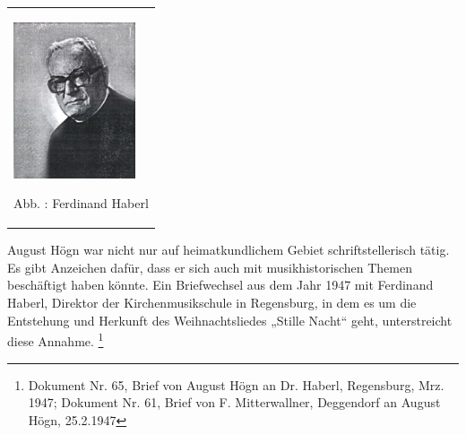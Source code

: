 \begin{flushleft}
\tablefirsthead{}
\tablehead{}
\tabletail{}
\tablelasttail{}
\begin{supertabular}{m{3.7879999cm}}

\begin{center}

\includegraphics[width=3.605cm,height=4.6cm]{pictures/zulassungsarbeit-img045.jpg}

\end{center}
Abb. : Ferdinand Haberl\\
\end{supertabular}
\end{flushleft}
August Högn war nicht nur auf heimatkundlichem Gebiet schriftstellerisch
tätig. Es gibt Anzeichen dafür, dass er sich auch mit musikhistorischen
Themen beschäftigt haben könnte. Ein Briefwechsel aus dem Jahr 1947 mit
Ferdinand Haberl, Direktor der Kirchenmusikschule in Regensburg, in dem
es um die Entstehung und Herkunft des Weihnachtsliedes „Stille Nacht“
geht, unterstreicht diese Annahme. \footnote{Dokument Nr. 65, Brief von
August Högn an Dr. Haberl, Regensburg, Mrz. 1947; Dokument Nr. 61,
Brief von F. Mitterwallner, Deggendorf an August Högn, 25.2.1947}
